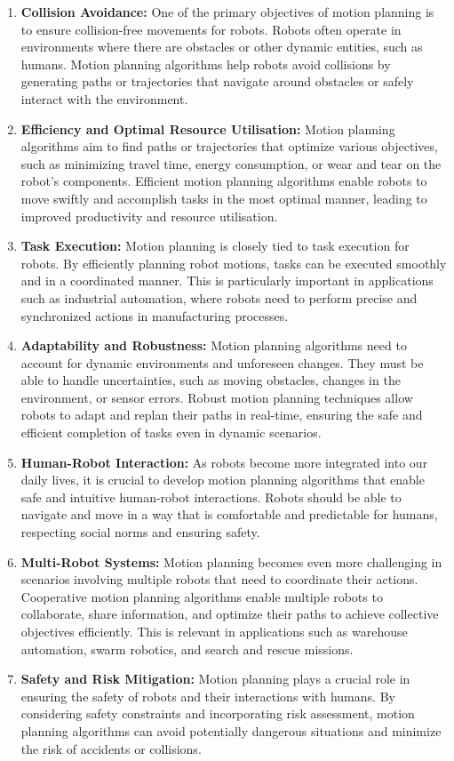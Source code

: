\begin{enumerate}
    \item \textbf{Collision Avoidance:} One of the primary objectives of motion planning is to ensure collision-free movements for robots. Robots often operate in environments where there are obstacles or other dynamic entities, such as humans. Motion planning algorithms help robots avoid collisions by generating paths or trajectories that navigate around obstacles or safely interact with the environment.
    \item \textbf{Efficiency and Optimal Resource Utilisation:} Motion planning algorithms aim to find paths or trajectories that optimize various objectives, such as minimizing travel time, energy consumption, or wear and tear on the robot's components. Efficient motion planning algorithms enable robots to move swiftly and accomplish tasks in the most optimal manner, leading to improved productivity and resource utilisation.
    \item \textbf{Task Execution:} Motion planning is closely tied to task execution for robots. By efficiently planning robot motions, tasks can be executed smoothly and in a coordinated manner. This is particularly important in applications such as industrial automation, where robots need to perform precise and synchronized actions in manufacturing processes.
    \item \textbf{Adaptability and Robustness:} Motion planning algorithms need to account for dynamic environments and unforeseen changes. They must be able to handle uncertainties, such as moving obstacles, changes in the environment, or sensor errors. Robust motion planning techniques allow robots to adapt and replan their paths in real-time, ensuring the safe and efficient completion of tasks even in dynamic scenarios.
    \item \textbf{Human-Robot Interaction:} As robots become more integrated into our daily lives, it is crucial to develop motion planning algorithms that enable safe and intuitive human-robot interactions. Robots should be able to navigate and move in a way that is comfortable and predictable for humans, respecting social norms and ensuring safety.
    \item \textbf{Multi-Robot Systems:} Motion planning becomes even more challenging in scenarios involving multiple robots that need to coordinate their actions. Cooperative motion planning algorithms enable multiple robots to collaborate, share information, and optimize their paths to achieve collective objectives efficiently. This is relevant in applications such as warehouse automation, swarm robotics, and search and rescue missions.
    \item \textbf{Safety and Risk Mitigation:} Motion planning plays a crucial role in ensuring the safety of robots and their interactions with humans. By considering safety constraints and incorporating risk assessment, motion planning algorithms can avoid potentially dangerous situations and minimize the risk of accidents or collisions.
\end{enumerate}

